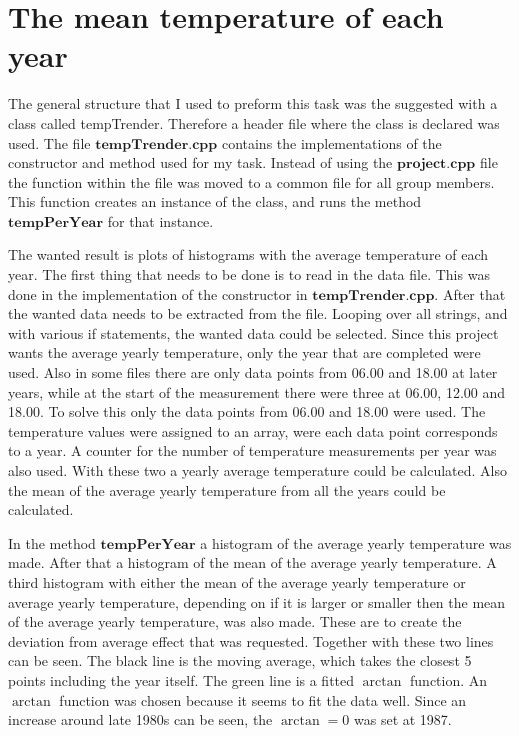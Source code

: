 \section{The mean temperature of each year}
The general structure that I used to preform this task was the suggested with a class called tempTrender. Therefore a header file where the class is declared was used. The file $\textbf{tempTrender.cpp}$ contains the implementations of the constructor and method used for my task.  Instead of using the $\textbf{project.cpp}$ file the function within the file was moved to a common file for all group members. This function creates an instance of the class, and runs the method  $\textbf{tempPerYear}$ for that instance. 


The wanted result is plots of histograms with the average temperature of each year. The first thing that needs to be done is to read in the data file. This was done in the implementation of the constructor in  $\textbf{tempTrender.cpp}$. After that the wanted data needs to be extracted from the file.  Looping over all strings, and with various if statements, the wanted data could be selected. Since this project wants the average yearly temperature, only the year that are completed were used. Also in some files there are only data points from 06.00 and 18.00 at later years, while at the start of the measurement there were three at 06.00, 12.00 and 18.00. To solve this only the data points from 06.00 and 18.00 were used. The temperature values were assigned to an array, were each data point corresponds to a year. A counter for the number of temperature measurements per year was also used. With these two a yearly average temperature could be calculated. Also the mean of the average yearly temperature from all the years could be calculated. 

In the method  $\textbf{tempPerYear}$ a histogram of the average yearly temperature was made. After that a histogram of the mean of the average yearly temperature. A third histogram with either the mean of the average yearly temperature or average yearly temperature, depending on if it is larger or smaller then the mean of the average yearly temperature, was also made. These are to create the deviation from average effect that was requested. Together with these two lines can be seen. The black line is the moving average, which takes the closest 5 points including the year itself. The green line is a fitted $\arctan$ function. An $\arctan$ function was chosen because it seems to fit the data well. Since an increase around late 1980s can be seen, the $\arctan=0$ was set at 1987. 

